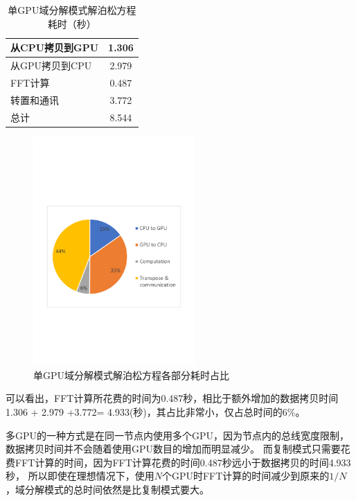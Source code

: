 \begin{table}[!htbp]
    \centering
    \footnotesize%
    \setlength{\tabcolsep}{4pt}%
    \renewcommand{\arraystretch}{1.2}%
    \caption{单GPU域分解模式解泊松方程耗时（秒）}
    \begin{tabular}{lc}
        \hline\hline
        从CPU拷贝到GPU    & 1.306     \\
        \hline
        从GPU拷贝到CPU    & 2.979     \\
        \hline
        FFT计算                       & 0.487     \\
        \hline
        转置和通讯                  & 3.772     \\
        \hline
        总计                              & 8.544    \\
        \hline\hline
    \end{tabular}
    \label{tab:1GPU_Poisson}
\end{table}

\begin{figure}[!htb]
    \centering
    \includegraphics[width=0.55\textwidth]{Img/domain_decomposition_1GPU.pdf}
    \caption{单GPU域分解模式解泊松方程各部分耗时占比}\label{fig:1GPU_Poisson}
\end{figure}

可以看出，FFT计算所花费的时间为0.487秒，相比于额外增加的数据拷贝时间1.306 + 2.979 +3.772= 4.933(秒)，其占比非常小，仅占总时间的6\%。

多GPU的一种方式是在同一节点内使用多个GPU，因为节点内的总线宽度限制，数据拷贝时间并不会随着使用GPU数目的增加而明显减少。
而复制模式只需要花费FFT计算的时间，因为FFT计算花费的时间0.487秒远小于数据拷贝的时间4.933秒，
所以即使在理想情况下，使用$N$个GPU时FFT计算的时间减少到原来的$1/N$，域分解模式的总时间依然是比复制模式要大。

